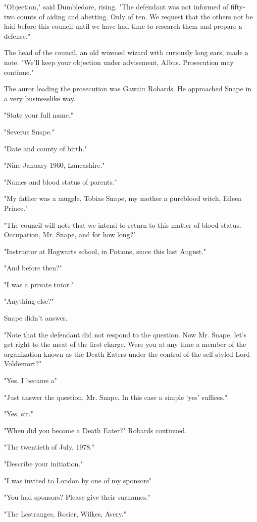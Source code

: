 "Objection," said Dumbledore, rising. "The defendant was not informed of fifty-two counts of aiding and abetting. Only of ten. We request that the others not be laid before this council until we have had time to research them and prepare a defense."

The head of the council, an old wizened wizard with curiously long ears, made a note. "We'll keep your objection under advisement, Albus. Prosecution may continue."

The auror leading the prosecution was Gawain Robards. He approached Snape in a very businesslike way.

"State your full name."

"Severus Snape."

"Date and county of birth."

"Nine January 1960, Lancashire."

"Names and blood status of parents."

"My father was a muggle, Tobias Snape, my mother a pureblood witch, Eileen Prince."

"The council will note that we intend to return to this matter of blood status. Occupation, Mr. Snape, and for how long?"

"Instructor at Hogwarts school, in Potions, since this last August."

"And before then?"

"I was a private tutor."

"Anything else?"

Snape didn't answer.

"Note that the defendant did not respond to the question. Now Mr. Snape, let's get right to the meat of the first charge. Were you at any time a member of the organization known as the Death Eaters under the control of the self-styled Lord Voldemort?"

"Yes. I became a{\el}"

"Just answer the question, Mr. Snape. In this case a simple `yes' suffices."

"Yes, sir."

"When did you become a Death Eater?" Robards continued.

"The twentieth of July, 1978."

"Describe your initiation."

"I was invited to London by one of my sponsors{\el}"

"You had sponsors? Please give their surnames."

"The Lestranges, Rosier, Wilkes, Avery."

